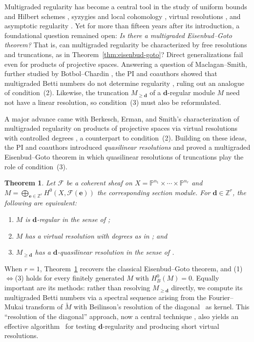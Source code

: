 \documentclass[11pt,reqno]{amsart}
\newtheorem{theorem}[lemma]{Theorem}
\theoremstyle{remark}
\newcommand{\dd}{\mathbf{d}}
\newcommand{\ee}{\mathbf{e}}
\newcommand{\PP}{\mathbb{P}}
\newcommand{\ZZ}{\mathbb{Z}}
\newcommand{\cF}{\mathcal{F}}
\begin{document}
Multigraded regularity has become a central tool in the study of uniform bounds and Hilbert schemes \cite{maclaganSmith05,aramovaCronaDeNegri00}, syzygies and local cohomology \cite{sidmanVanTuylWang06,HSS06,botbolChardin17}, virtual resolutions  \cite{BES20,bruceHellerSayrafi26}, and asymptotic regularity \cite{haStrunk07,bruceHellerSayrafiSeceleanu25}. Yet for more than fifteen years after its introduction, a foundational question remained open: \emph{Is there a multigraded Eisenbud--Goto theorem?} That is, can multigraded regularity be characterized by free resolutions and truncations, as in Theorem~\ref{thm:eisenbud-goto}? Direct generalizations fail even for products of projective spaces. Answering a question of Maclagan--Smith, further studied by Botbol--Chardin \cite{botbolChardin17}, the PI and coauthors showed that multigraded Betti numbers do not determine regularity \cite[Ex.~5.1]{bruceHellerSayrafi26}, ruling out an analogue of condition~(2). Likewise, the truncation $M_{\geq \dd}$ of a $\dd$-regular module $M$ need not have a linear resolution, so condition~(3) must also be reformulated.

A major advance came with Berkesch, Erman, and Smith's characterization of multigraded regularity on products of projective spaces via virtual resolutions with controlled degrees \cite[Thm.~2.9]{BES20}, a counterpart to condition~(2). Building on these ideas, the PI and coauthors introduced \emph{quasilinear resolutions} and proved a multigraded Eisenbud--Goto theorem in which quasilinear resolutions of truncations play the role of condition~(3).

\begin{theorem}\cite[Thm.~A]{bruceHellerSayrafi26}\label{thm:mgreg-main}
Let $\cF$ be a coherent sheaf on $X=\PP^{n_1}\times \cdots \times \PP^{n_r}$ and $M=\bigoplus_{\ee\in\ZZ^r} H^0(X,\cF(\ee))$ the corresponding section module. For $\dd \in \ZZ^r$, the following are equivalent:
\begin{enumerate}
\item $M$ is $\dd$-regular in the sense of \cite{maclaganSmith04};
\item $M$ has a virtual resolution with degrees as in \cite[Thm.~2.9]{BES20}; and
\item $M_{\geq \dd}$ has a $\dd$-quasilinear resolution in the sense of \cite{bruceHellerSayrafi26}.
\end{enumerate}
\end{theorem}
When $r=1$, Theorem~\ref{thm:mgreg-main} recovers the classical Eisenbud--Goto theorem, and (1)$\Leftrightarrow$(3) holds for every finitely generated $M$ with $H^0_B(M)=0$. Equally important are its methods: rather than resolving $M_{\geq\dd}$ directly, we compute its multigraded Betti numbers via a spectral sequence arising from the Fourier--Mukai transform of $\widetilde{M}$ with Beilinson's resolution of the diagonal~\cite{beilinson78} as kernel. This ``resolution of the diagonal'' approach, now a central technique \cite{brownErmanTate,brownErman24-1,HHL24,brownSayrafi24}, also yields an effective algorithm~\cite{ABLS20,crantonHellerNemati22} for testing $\dd$-regularity and producing short virtual resolutions.
\end{document}
